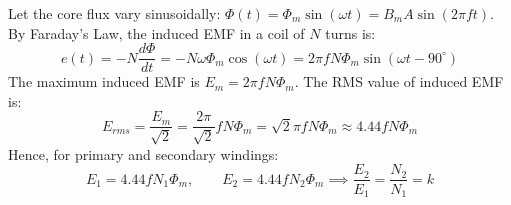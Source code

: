 \begin{theorem}
Let the core flux vary sinusoidally: $\Phi(t) = \Phi_m \sin(\omega t) = B_m A \sin(2\pi f t)$. By Faraday's Law, the induced EMF in a coil of $N$ turns is:
\begin{equation}
e(t) = -N \frac{d\Phi}{dt} = -N \omega \Phi_m \cos(\omega t) = 2\pi f N \Phi_m \sin(\omega t - 90^\circ)
\end{equation}
The maximum induced EMF is $E_m = 2\pi f N \Phi_m$. The RMS value of induced EMF is:
\begin{equation}
E_{rms} = \frac{E_m}{\sqrt{2}} = \frac{2\pi}{\sqrt{2}} f N \Phi_m = \sqrt{2}\pi f N \Phi_m \approx 4.44 f N \Phi_m
\end{equation}
Hence, for primary and secondary windings:
\begin{equation}
E_1 = 4.44 f N_1 \Phi_m, \qquad E_2 = 4.44 f N_2 \Phi_m \implies \frac{E_2}{E_1} = \frac{N_2}{N_1} = k
\end{equation}
\end{theorem}

